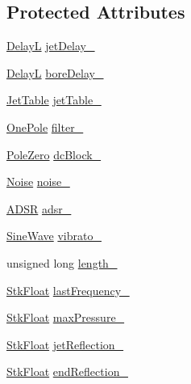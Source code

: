 \subsection*{Protected Attributes}
\begin{DoxyCompactItemize}
\item 
\hyperlink{class_nyq_1_1_delay_l}{DelayL} \hyperlink{class_nyq_1_1_flute_ae0e559408b7440c607ba30cdd8a4678d}{jet\+Delay\+\_\+}
\item 
\hyperlink{class_nyq_1_1_delay_l}{DelayL} \hyperlink{class_nyq_1_1_flute_aced0ab6f7ffe0774088513b44e7114e2}{bore\+Delay\+\_\+}
\item 
\hyperlink{class_nyq_1_1_jet_table}{Jet\+Table} \hyperlink{class_nyq_1_1_flute_abd837ca153d56c8a035703f5293e12ab}{jet\+Table\+\_\+}
\item 
\hyperlink{class_nyq_1_1_one_pole}{One\+Pole} \hyperlink{class_nyq_1_1_flute_afcc039d5a3c6b28e5ddb225f25358e94}{filter\+\_\+}
\item 
\hyperlink{class_nyq_1_1_pole_zero}{Pole\+Zero} \hyperlink{class_nyq_1_1_flute_a2e549cf69c4b20f95cd8bfb37d8a5a7d}{dc\+Block\+\_\+}
\item 
\hyperlink{class_nyq_1_1_noise}{Noise} \hyperlink{class_nyq_1_1_flute_a507de5716893c377ea197ef0642d9fdb}{noise\+\_\+}
\item 
\hyperlink{class_nyq_1_1_a_d_s_r}{A\+D\+SR} \hyperlink{class_nyq_1_1_flute_a1a88aeccb66942e59de52bfd249a4d1e}{adsr\+\_\+}
\item 
\hyperlink{class_nyq_1_1_sine_wave}{Sine\+Wave} \hyperlink{class_nyq_1_1_flute_a57638f7929851e53a510e3ea7813bd7b}{vibrato\+\_\+}
\item 
unsigned long \hyperlink{class_nyq_1_1_flute_a370736a905a96a64dfbdd2a333c5183f}{length\+\_\+}
\item 
\hyperlink{namespace_nyq_a044fa20a706520a617bbbf458a7db7e4}{Stk\+Float} \hyperlink{class_nyq_1_1_flute_ae8aa10e237568f1002e8f13e9eed5e16}{last\+Frequency\+\_\+}
\item 
\hyperlink{namespace_nyq_a044fa20a706520a617bbbf458a7db7e4}{Stk\+Float} \hyperlink{class_nyq_1_1_flute_ad3e12b0d0d09b2506b818a7d63602ca0}{max\+Pressure\+\_\+}
\item 
\hyperlink{namespace_nyq_a044fa20a706520a617bbbf458a7db7e4}{Stk\+Float} \hyperlink{class_nyq_1_1_flute_abe8c6ef94ce53c5dece16c0a423785db}{jet\+Reflection\+\_\+}
\item 
\hyperlink{namespace_nyq_a044fa20a706520a617bbbf458a7db7e4}{Stk\+Float} \hyperlink{class_nyq_1_1_flute_a506181b1b96d926f4907983655fa6c58}{end\+Reflection\+\_\+}

\end{DoxyCompactItemize}
